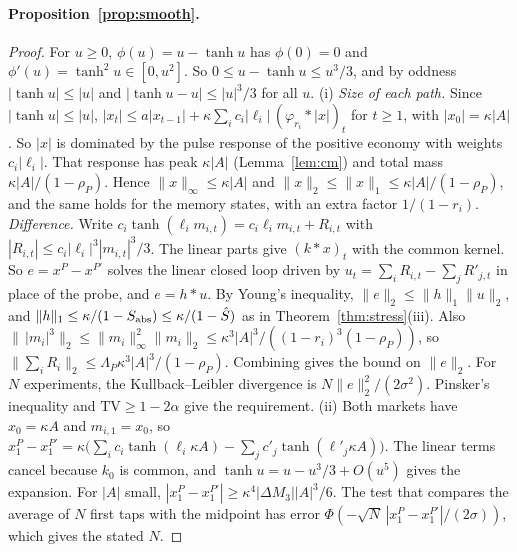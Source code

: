 \documentclass[12pt]{article}
\theoremstyle{definition}
\theoremstyle{remark}
\begin{document}
\paragraph{Proposition~\ref{prop:smooth}.}
\begin{proof}
For $u\ge0$, $\phi(u)=u-\tanh u$ has $\phi(0)=0$ and $\phi'(u)=\tanh^2u\in[0,u^2]$. So $0\le u-\tanh u\le u^3/3$, and by oddness $|\tanh u|\le|u|$ and $|\tanh u-u|\le|u|^3/3$ for all $u$.
(i) \emph{Size of each path.} Since $|\tanh u|\le|u|$, $|x_t|\le a|x_{t-1}|+\kappa\sum_ic_i|\ell_i|\,(\varphi_{r_i}*|x|)_t$ for $t\ge1$, with $|x_0|=\kappa|A|$. So $|x|$ is dominated by the pulse response of the positive economy with weights $c_i|\ell_i|$. That response has peak $\kappa|A|$ (Lemma~\ref{lem:cm}) and total mass $\kappa|A|/(1-\rho_P)$. Hence $\|x\|_\infty\le\kappa|A|$ and $\|x\|_2\le\|x\|_1\le\kappa|A|/(1-\rho_P)$, and the same holds for the memory states, with an extra factor $1/(1-r_i)$.
\emph{Difference.} Write $c_i\tanh(\ell_im_{i,t})=c_i\ell_im_{i,t}+R_{i,t}$ with $|R_{i,t}|\le c_i|\ell_i|^3|m_{i,t}|^3/3$. The linear parts give $(k*x)_t$ with the common kernel. So $e=x^P-x^{P'}$ solves the linear closed loop driven by $u_t=\sum_iR_{i,t}-\sum_jR'_{j,t}$ in place of the probe, and $e=h*u$. By Young's inequality, $\|e\|_2\le\|h\|_1\|u\|_2$, and $\|h\|_1\le\kappa/(1-S_{\rm abs})\le\kappa/(1-\hat S)$ as in Theorem~\ref{thm:stress}(iii). Also $\|\,|m_i|^3\|_2\le\|m_i\|_\infty^2\|m_i\|_2\le\kappa^3|A|^3/((1-r_i)^3(1-\rho_P))$, so $\|\sum_iR_i\|_2\le\Lambda_P\kappa^3|A|^3/(1-\rho_P)$. Combining gives the bound on $\|e\|_2$. For $N$ experiments, the Kullback--Leibler divergence is $N\|e\|_2^2/(2\sigma^2)$. Pinsker's inequality and $\mathrm{TV}\ge1-2\alpha$ give the requirement.
(ii) Both markets have $x_0=\kappa A$ and $m_{i,1}=x_0$, so $x_1^P-x_1^{P'}=\kappa\bigl(\sum_ic_i\tanh(\ell_i\kappa A)-\sum_jc'_j\tanh(\ell'_j\kappa A)\bigr)$. The linear terms cancel because $k_0$ is common, and $\tanh u=u-u^3/3+O(u^5)$ gives the expansion. For $|A|$ small, $|x_1^P-x_1^{P'}|\ge\kappa^4|\Delta M_3||A|^3/6$. The test that compares the average of $N$ first taps with the midpoint has error $\Phi(-\sqrt N\,|x_1^P-x_1^{P'}|/(2\sigma))$, which gives the stated $N$.
\end{proof}
\end{document}

